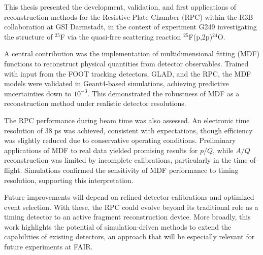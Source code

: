 



This thesis presented the development, validation, and first applications of reconstruction methods for the Resistive Plate Chamber (\gls{RPC}) within the \gls{R3B} collaboration at GSI Darmstadt, in the context of experiment G249 investigating the structure of $^{25}$F via the quasi-free scattering reaction $^{25}$F(p,2p)$^{24}$O.  

A central contribution was the implementation of multidimensional fitting (\gls{MDF}) functions to reconstruct physical quantities from detector observables. Trained with input from the FOOT tracking detectors, GLAD, and the \gls{RPC}, the \gls{MDF} models were validated in Geant4-based simulations, achieving predictive uncertainties down to $10^{-3}$. This demonstrated the robustness of \gls{MDF} as a reconstruction method under realistic detector resolutions.  

The \gls{RPC} performance during beam time was also assessed. An electronic time resolution of 38 ps was achieved, consistent with expectations, though efficiency was slightly reduced due to conservative operating conditions. Preliminary applications of \gls{MDF} to real data yielded promising results for $p/Q$, while $A/Q$ reconstruction was limited by incomplete calibrations, particularly in the time-of-flight. Simulations confirmed the sensitivity of \gls{MDF} performance to timing resolution, supporting this interpretation.  

Future improvements will depend on refined detector calibrations and optimized event selection. With these, the \gls{RPC} could evolve beyond its traditional role as a timing detector to an active fragment reconstruction device. More broadly, this work highlights the potential of simulation-driven methods to extend the capabilities of existing detectors, an approach that will be especially relevant for future experiments at \gls{FAIR}.  
